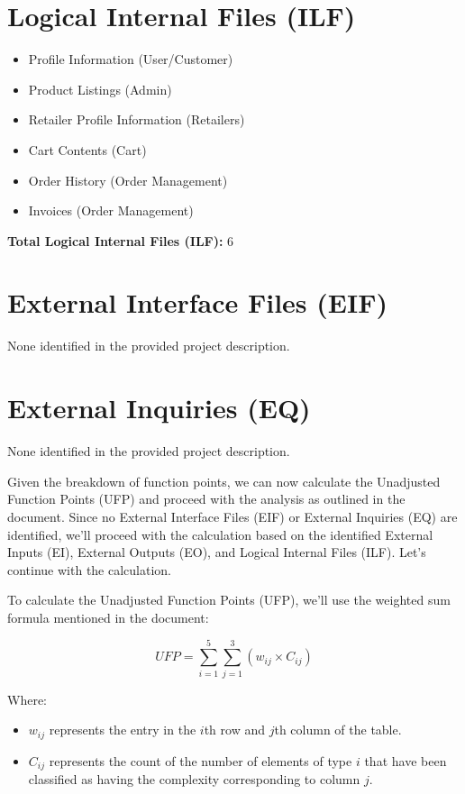 \documentclass{article}
\begin{document}
\section*{Logical Internal Files (ILF)}
\begin{itemize}[leftmargin=*]
    \item Profile Information (User/Customer)
    \item Product Listings (Admin)
    \item Retailer Profile Information (Retailers)
    \item Cart Contents (Cart)
    \item Order History (Order Management)
    \item Invoices (Order Management)
\end{itemize}
\textbf{Total Logical Internal Files (ILF):} 6

\section*{External Interface Files (EIF)}
None identified in the provided project description.

\section*{External Inquiries (EQ)}
None identified in the provided project description.

Given the breakdown of function points, we can now calculate the Unadjusted Function Points (UFP) and proceed with the analysis as outlined in the document. Since no External Interface Files (EIF) or External Inquiries (EQ) are identified, we'll proceed with the calculation based on the identified External Inputs (EI), External Outputs (EO), and Logical Internal Files (ILF). Let's continue with the calculation.

To calculate the Unadjusted Function Points (UFP), we'll use the weighted sum formula mentioned in the document:

\[
UFP = \sum_{i=1}^{5} \sum_{j=1}^{3} (w_{ij} \times C_{ij})
\]

Where:
\begin{itemize}[leftmargin=*]
    \item $w_{ij}$ represents the entry in the $i$th row and $j$th column of the table.
    \item $C_{ij}$ represents the count of the number of elements of type $i$ that have been classified as having the complexity corresponding to column $j$.
\end{itemize}
\end{document}
